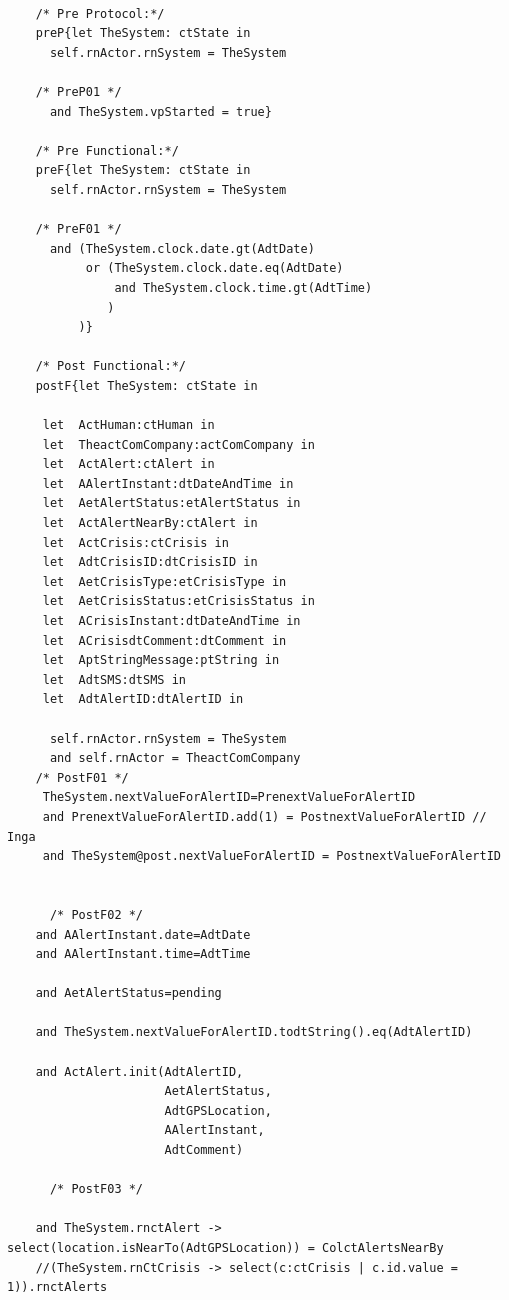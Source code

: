	\scriptsize
	\vspace{0.5cm}
	\begin{lstlisting}[style=MessirStyle,firstnumber=auto,captionpos=b,caption={\msrmessir (MCL-oriented) specification of the operation \emph{oeAlert}.},label=OM-actComCompany-oeAlert-MCL-LST]

	/* Pre Protocol:*/ 
	preP{let TheSystem: ctState in
	  self.rnActor.rnSystem = TheSystem
	  
	/* PreP01 */
	  and TheSystem.vpStarted = true}
	
	/* Pre Functional:*/
	preF{let TheSystem: ctState in
	  self.rnActor.rnSystem = TheSystem
	
	/* PreF01 */
	  and (TheSystem.clock.date.gt(AdtDate)
	       or (TheSystem.clock.date.eq(AdtDate)
	           and TheSystem.clock.time.gt(AdtTime)
	          )
	      )}
	
	/* Post Functional:*/ 
	postF{let TheSystem: ctState in
	  
	 let  ActHuman:ctHuman in
	 let  TheactComCompany:actComCompany in
	 let  ActAlert:ctAlert in
	 let  AAlertInstant:dtDateAndTime in
	 let  AetAlertStatus:etAlertStatus in
	 let  ActAlertNearBy:ctAlert in
	 let  ActCrisis:ctCrisis in
	 let  AdtCrisisID:dtCrisisID in
	 let  AetCrisisType:etCrisisType in
	 let  AetCrisisStatus:etCrisisStatus in
	 let  ACrisisInstant:dtDateAndTime in
	 let  ACrisisdtComment:dtComment in
	 let  AptStringMessage:ptString in
	 let  AdtSMS:dtSMS in
	 let  AdtAlertID:dtAlertID in
	 
	  self.rnActor.rnSystem = TheSystem
	  and self.rnActor = TheactComCompany
	/* PostF01 */
	 TheSystem.nextValueForAlertID=PrenextValueForAlertID
	 and PrenextValueForAlertID.add(1) = PostnextValueForAlertID // Inga
	 and TheSystem@post.nextValueForAlertID = PostnextValueForAlertID
	
	
	  /* PostF02 */
	and AAlertInstant.date=AdtDate
	and AAlertInstant.time=AdtTime
	
	and AetAlertStatus=pending
	        
	and TheSystem.nextValueForAlertID.todtString().eq(AdtAlertID)
	
	and ActAlert.init(AdtAlertID,
	                  AetAlertStatus,
	                  AdtGPSLocation,
	                  AAlertInstant,
	                  AdtComment)
	      
	  /* PostF03 */
	  
	and TheSystem.rnctAlert -> select(location.isNearTo(AdtGPSLocation)) = ColctAlertsNearBy
	//(TheSystem.rnCtCrisis -> select(c:ctCrisis | c.id.value = 1)).rnctAlerts
	

\end{lstlisting}
